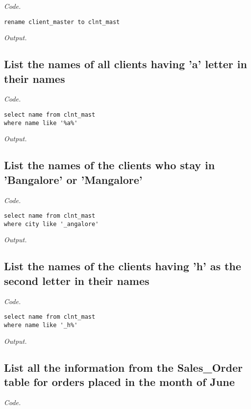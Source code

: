 \documentclass[12pt]{article}
\begin{document}
\textit{Code.}

\begin{lstlisting}
rename client_master to clnt_mast
\end{lstlisting}

\textit{Output.}\\

\subsection{List the names of all clients having 'a' letter in their names}

\textit{Code.}

\begin{lstlisting}
select name from clnt_mast
where name like '%a%'
\end{lstlisting}

\textit{Output.}\\

\subsection{List the names of the clients who stay in 'Bangalore' or 'Mangalore'}

\textit{Code.}

\begin{lstlisting}
select name from clnt_mast
where city like '_angalore'
\end{lstlisting}

\textit{Output.}\\

\subsection{List the names of the clients having 'h' as the second letter in their names}

\textit{Code.}

\begin{lstlisting}
select name from clnt_mast
where name like '_h%'
\end{lstlisting}

\textit{Output.}\\

\subsection{List all the information from the Sales\_Order table for orders placed in the month of June}

\textit{Code.}
\end{document}
